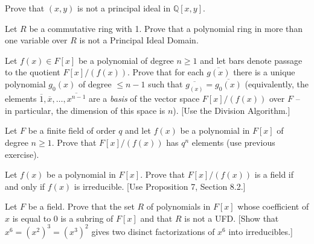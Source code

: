 \documentclass[12pt,letterpaper]{hmcpset}
\newcommand{\Qq}{\mathbb{Q}}
\begin{document}

\begin{problem}[9.1.6]
	Prove that $(x,y)$ is not a principal ideal  in $\Qq[x,y].$
\end{problem}

\begin{solution}
\vfill
\end{solution}
\newpage

\begin{problem}[9.1.7]
	Let $R$ be a commutative ring with 1. Prove that a polynomial ring in more than one variable over $R$ is not a Principal Ideal Domain.
\end{problem}

\begin{solution}
\vfill
\end{solution}
\newpage

\begin{problem}
	Let $f(x)\in F[x]$ be a polynomial of degree $n \ge 1$ and let bars denote passage to the quotient $F[x]/(f(x))$. Prove that for each $\overline{g(x)}$ there is a unique polynomial $g_0(x)$ of degree $\le n-1$ such that $\overline{g_(x)} = \overline{g_0(x)}$ (equivalently, the elements $\overline{1}, \overline{x}, \dots , \overline{x^{n-1}}$ are a \emph{basis} of the vector space $F[x]/(f(x))$ over $F$ -- in particular, the dimension of this space is $n$). [Use the Division Algorithm.]
\end{problem}

\begin{problem}[9.2.2]
	Let $F$ be a finite field of order $q$ and let $f(x)$ be a polynomial in $F[x]$ of degree $n \ge 1$. Prove that $F[x]/(f(x))$ has $q^n$ elements (use previous exercise).
\end{problem}
\begin{solution}
\vfill
\end{solution}
\newpage

\begin{problem}[9.2.3]
	Let $f(x)$ be a polynomial in $F[x].$ Prove that $F[x]/(f(x))$ is a field if and only if $f(x)$ is irreducible. [Use Proposition 7, Section 8.2.]
\end{problem}
\begin{solution}
	\vfill
\end{solution}
\newpage

\begin{problem}[9.3.3]
	Let $F$ be a field. Prove that the set $R$ of polynomials in $F[x]$ whose coefficient of $x$ is equal to 0 is a subring of $F[x]$ and that $R$ is not a UFD. [Show that $x^6 = (x^2)^3 = (x^3)^2$ gives two disinct factorizations of $x^6$ into irreducibles.]
\end{problem}
\begin{solution}
	\vfill
\end{solution}
\end{document}
